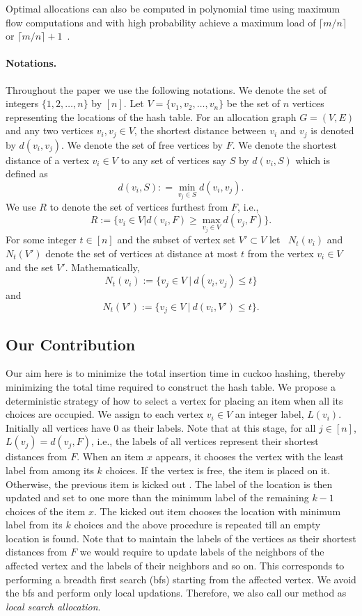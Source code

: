 \noindent Optimal allocations can also
be computed in polynomial time using maximum 
flow computations and with high probability achieve a maximum load of 
$\lceil m/n\rceil$ or $\lceil m/n\rceil +1$~\cite{sek99}. 

\paragraph{Notations.} Throughout the paper we use the following notations. We denote the set of integers $\{1,2,\ldots, n\}$ by $[n]$. Let $V=\{v_1,v_2,\ldots, v_n\}$ be the set of $n$ vertices representing the locations of the hash table. For an allocation graph $G=(V,E)$ and any two vertices $v_i,v_j\in V$, the shortest distance between $v_i$ and $v_j$ is denoted by $d(v_i,v_j).$  We denote the set of free vertices by $F$. We denote the shortest distance of a vertex $v_i\in V$ to any set of vertices say $S$ by $d(v_i,S)$ which is defined as \[d(v_i,S): = \min_{v_j\in S} d(v_i,v_j).\] We use $R$ to denote the set of vertices furthest from $F$, i.e.,
\[   R:= \{ v_i\in V |d(v_i, F ) \ge \max_{ v_j \in V} d(v_j,F)\}.
\]
For some integer $t\in[n]$ and the subset of vertex set $V' \subset V$ let ~$N_{t}(v_i)$ and $N_{t}(V')$ denote the set of vertices at distance at most $t$ from the vertex $v_i \in V$ and the set $V'$. Mathematically,
\[ N_{t}(v_i) := \{ v_j \in V~| ~d(v_i,v_j) \le t  \} \]
and 
\[ N_{t}(V') := \{ v_j \in V~| ~d(v_i,V') \le t  \} .\]
\subsection{Our Contribution}
Our aim here is to minimize the total insertion time in cuckoo hashing, thereby minimizing the total time required to construct the hash table. We propose a deterministic strategy of how to select a vertex for placing an item when all its choices are occupied.
We assign to each vertex $v_i\in V$ an integer label, $L(v_i)$. Initially all vertices have $0$ as their labels. Note that at this stage, for all  $j\in [n]$, $L(v_j) =d(v_j,F)$, i.e., the labels of all vertices represent their shortest distances from $F$. When an item $x$ appears, it chooses the vertex with the least label from among its $k$ choices. If the vertex is free, the item is placed on it. Otherwise, the previous item is kicked out . The label of the location is then updated and set to one more than the minimum label of the remaining $k-1$ choices of the item $x$. The kicked out item chooses the location with minimum label from its $k$ choices and the above procedure is repeated till an empty location is found. 
Note that to maintain the labels of the vertices as their shortest distances from $F$ we would require to update labels of the neighbors of the affected vertex and the labels of their neighbors and so on. This corresponds to performing a breadth first search (bfs) starting from the affected vertex. We avoid the bfs and perform only local updations. Therefore, we also call our method as \emph{local search allocation}. 

